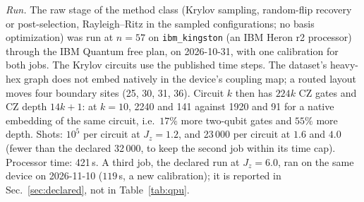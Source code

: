 \documentclass[aps,prx,onecolumn,10pt,nofootinbib,longbibliography,floatfix]{revtex4-2}
\theoremstyle{remark}
\newcommand{\Jz}{J_z}
\begin{document}
\emph{Run.} The raw stage of the method class (Krylov sampling, random-flip recovery or post-selection, Rayleigh--Ritz
in the sampled configurations; no basis optimization) was run at $n=57$ on \texttt{ibm\_kingston} (an IBM Heron r2 %
processor) through the IBM Quantum free plan, on 2026-10-31, with one calibration for both jobs. The Krylov circuits %
use the published time steps. The dataset's heavy-hex graph does not embed natively in the device's coupling map;
a routed layout moves four boundary sites (25, 30, 31, 36). Circuit $k$ then has $224k$ CZ gates and CZ depth $14k+1$: %
at $k=10$, 2240 and 141 against 1920 and 91 for a native embedding of the same circuit, i.e.\ $17\%$ more two-qubit %
gates and $55\%$ more depth. Shots: $10^5$ per circuit at $\Jz=1.2$, and 23\,000 per circuit at $1.6$ and $4.0$ %
(fewer than the declared 32\,000, to keep the second job within its time cap). Processor time: 421\,s. %
A third job, the declared run at $\Jz=6.0$, ran on the same device on 2026-11-10 ($119$\,s, a new calibration); it is %
reported in Sec.~\ref{sec:declared}, not in Table~\ref{tab:qpu}.
\end{document}
